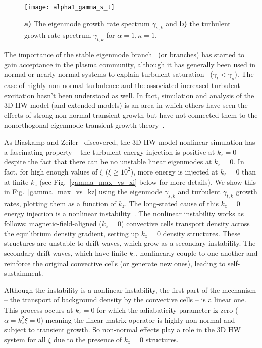 \documentclass[twocolumn,showkeys,superscriptaddress]{revtex4}
\begin{document}
\begin{figure}
\centerline{\texttt{[image: alpha1\_gamma\_s\_t]}}
\caption{{\bf a)} The eigenmode growth rate spectrum $\gamma_{s,k}$ and {\bf b)} the turbulent growth rate spectrum $\gamma_{t,k}$ for $\alpha = 1, \kappa=1$.}
\label{alpha1_gamma_s_t}
\end{figure}

The importance of the stable eigenmode branch~\cite{baver2002} (or branches) has started to gain acceptance in the plasma community, although it has generally been used in normal
or nearly normal systems to explain turbulent saturation~\cite{terry2006b,hatch2011,makwana2011} ($\gamma_{t} < \gamma_{s}$). 
The case of highly non-normal turbulence and the associated increased turbulent excitation hasn't been understood as well. 
In fact, simulation and analysis of the 3D HW model (and extended models) is an area in which others have seen the effects of strong non-normal transient growth
but have not connected them to the nonorthogonal eigenmode transient growth theory~\cite{biskamp1995,drake1995,scott2002,scott2005,umansky2009,friedman2012b}.

As Biaskamp and Zeiler~\cite{biskamp1995} discovered, the 3D HW model nonlinear simulation has a fascinating property -- 
the turbulent energy injection is positive at $k_z = 0$ despite the fact that there can be no unstable linear eigenmodes at $k_z=0$.
In fact, for high enough values of $\xi$ ($\xi \ge 10^2$), more energy is injected at $k_z = 0$ than at finite $k_z$ (see Fig.~\ref{gamma_max_vs_xi} below for more details).
We show this in Fig.~\ref{gamma_max_vs_kz} using the eigenmode $\gamma_{s,k}$ and turbulent $\gamma_{t,k}$ growth rates, plotting them as a function of $k_z$.
The long-stated cause of this $k_z=0$ energy injection is a nonlinear instability~\cite{biskamp1995,drake1995}. 
The nonlinear instability works as follows: magnetic-field-aligned ($k_z=0$) convective cells transport density across the equilibrium density gradient, setting up $k_z=0$ density structures. 
These structures are unstable to drift waves, which grow as a secondary instability.
The secondary drift waves, which have finite $k_z$, nonlinearly couple to one another and reinforce the original convective cells (or generate new ones), leading to self-sustainment.

Although the instability is a nonlinear instability, the first part of the mechanism -- the transport of background density by the convective cells -- is a linear one. This process occurs at $k_z=0$
for which the adiabaticity parameter iz zero ($\alpha = k_z^2 \xi = 0$) meaning the linear matrix operator is highly non-normal and subject to transient growth.
So non-normal effects play a role in the 3D HW system for all $\xi$ due to the presence of $k_z=0$ structures.
\end{document}
